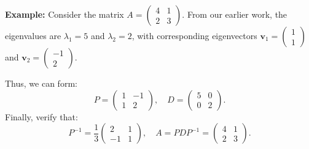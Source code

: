 \documentclass[]{article}
\begin{document}
	\noindent \textbf{Example:}
	Consider the matrix $A = \begin{pmatrix} 4 & 1 \\ 2 & 3 \end{pmatrix}$.
	From our earlier work, the eigenvalues are $\lambda_1 = 5$ and $\lambda_2 = 2$, with corresponding eigenvectors $\mathbf{v}_1 = \begin{pmatrix} 1 \\ 1 \end{pmatrix}$ and $\mathbf{v}_2 = \begin{pmatrix} -1 \\ 2 \end{pmatrix}$.
	
	Thus, we can form:
	$$
	P = \begin{pmatrix} 1 & -1 \\ 1 & 2 \end{pmatrix},
	\quad D = \begin{pmatrix} 5 & 0 \\ 0 & 2 \end{pmatrix}.
	$$
	Finally, verify that:
	$$
	P^{-1} = \frac{1}{3} \begin{pmatrix} 2 & 1 \\ -1 & 1 \end{pmatrix},
	\quad A = PDP^{-1} = \begin{pmatrix} 4 & 1 \\ 2 & 3 \end{pmatrix}.
	$$
	
\end{document}
